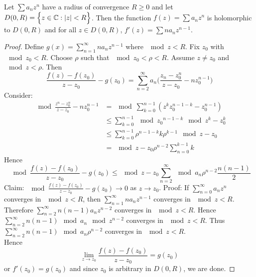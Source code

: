 \documentclass[12pt]{article}
\begin{document}
\begin{theorem} Let $\sum a_nz^n$ have a radius of convergence $R \geq 0$ and let $D(0,R) = \Big\{ z \in \mathbb{C}: \abs{z} < R \Big\}$. Then the function $f(z) = \sum a_nz^n$ is holomorphic to $D(0,R)$ and for all $z \in D(0,R)$, $f'(z) = \sum na_nz^{n-1}$.\end{theorem} 
\begin{proof} 
Define $g(x) = \sum_{n=1}^\infty na_nz^{n-1}$ where $\mod{z} < R$. Fix $z_0$ with $\mod{z_0} < R$. Choose $\rho$ such that $\mod{z_0} < \rho < R$. Assume $z \neq z_0$ and $\mod{z} < \rho$. Then $$ 
\frac{ f(z) - f(z_0)}{z-z_0} - g(z_0) = \sum_{n=2}^\infty a_n\Big( \frac{z_n - z_0^n}{z - z_0} - nz_0^{n-1}\Big) $$ 
Consider: $$ \begin{aligned} \mod{ \frac{z^n - z_0^n}{z-z_0} - nz_0^{n-1}} &= \mod{\sum_{k=0}^{n-1} (z^kz_0^{n-1-k} - z_0^{n-1})} \\ &\leq \sum_{k=0}^{n-1} \mod{z_0}^{n-1-k} \mod{z^k - z_0^k} \\ &\leq \sum_{k=0}^{n-1} \rho^{n-1-k} k\rho^{k-1} \mod{z-z_0} \\ &= \mod{z-z_0}\rho^{n-2}\sum_{n=0}^{k-1} k \end{aligned} $$ 
Hence $$ \mod{ \frac{f(z) - f(z_0)}{z-z_0} - g(z_0)} \leq \mod{z-z_0}\sum_{n=2}^\infty \mod{a_n}\rho^{n-2} \frac{n(n-1)}{2} $$ 
Claim: $ \mod{ \frac{f(z) - f(z_0)}{z-z_0} - g(z_0)} \to 0$ as $z \to z_0$. Proof: If $\sum_{n=0}^\infty a_nz^n$ converges in $\mod{z} < R$, then $\sum_{n=1}^\infty na_nz^{n-1}$ converges in $\mod{z} < R$. Therefore $\sum_{n=2}^\infty n(n-1)a_nz^{n-2}$ converges in $\mod{z} < R$. Hence $\sum_{n=2}^\infty n(n-1)\mod{a_n}\mod{z}^{n-2}$ converges in $\mod{z} < R$. Thus $\sum_{n=2}^\infty n(n-1)\mod{a_n}\rho^{n-2}$ converges in $\mod{z} < R$. \\ 
Hence $$ \lim_{z\to z_0} \frac{f(z) - f(z_0)}{z-z_0} = g(z_0) $$
or $f'(z_0) = g(z_0)$ and since $z_0$ is arbitrary in $D(0,R)$, we are done. \end{proof} 
\end{document}
